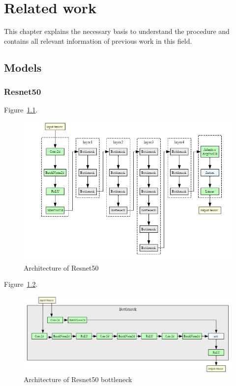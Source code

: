 \chapter{Related work}
This chapter explains the necessary basis to understand the procedure and contains all relevant information of previous work in this field.


\section{Models}

\subsection{Resnet50}
Figure~\ref{fig:resnet50_architecture}.

\begin{figure}[H]
    \begin{center}
    \includegraphics[width=15cm]{../images/resnet50_architecture.png}
    \caption{Architecture of Resnet50}
   \label{fig:resnet50_architecture}
    \end{center}
\end{figure}

Figure~\ref{fig:resnet50_architecture_bottleneck}.

\begin{figure}[H]
    \begin{center}
    \includegraphics[width=15cm]{../images/resnet50_architecture_bottleneck.png}
    \caption{Architecture of Resnet50 bottleneck}
   \label{fig:resnet50_architecture_bottleneck}
    \end{center}
\end{figure}

